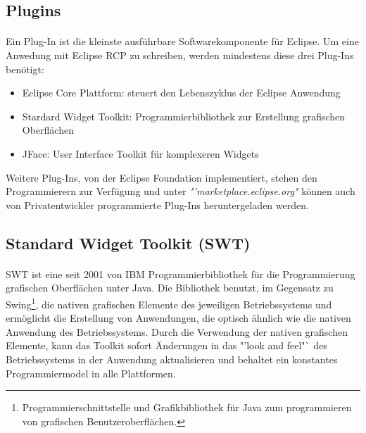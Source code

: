\subsection{Plugins}
\paragraph{}
Ein Plug-In ist die kleinste ausführbare Softwarekomponente für Eclipse. Um eine Anwedung mit Eclipse RCP zu schreiben, werden mindestens diese drei Plug-Ins benötigt:
\begin{itemize}
\item Eclipse Core Plattform: steuert den Lebenszyklus der Eclipse Anwendung
\item Stardard Widget Toolkit: Programmierbibliothek zur Erstellung grafischen Oberflächen
\item JFace: User Interface Toolkit für komplexeren Widgets
\end{itemize}

Weitere Plug-Ins, von der Eclipse Foundation implementiert, stehen den Programmierern zur Verfügung und unter \textit{"'marketplace.eclipse.org"} können auch von Privatentwickler programmierte Plug-Ins heruntergeladen werden. \cite{Eclipse}

\subsection{Standard Widget Toolkit (SWT)}
\paragraph{}
SWT ist eine seit 2001 von IBM Programmierbibliothek für die Programmierung grafischen Oberflächen unter Java. Die Bibliothek benutzt, im Gegensatz zu Swing\footnote{Programmierschnittstelle und Grafikbibliothek für Java zum programmieren von grafischen Benutzeroberflächen.}, die nativen grafischen Elemente des jeweiligen Betriebssystems und ermöglicht die Erstellung von Anwendungen, die optisch ähnlich wie die nativen Anwendung des Betriebssystems. Durch die Verwendung der nativen grafischen Elemente, kann das Toolkit sofort Änderungen in das "'look and feel"` des Betriebssystems in der Anwendung aktualisieren und behaltet ein konstantes Programmiermodel in alle Plattformen.
\cite{EclipseSWT}\\

